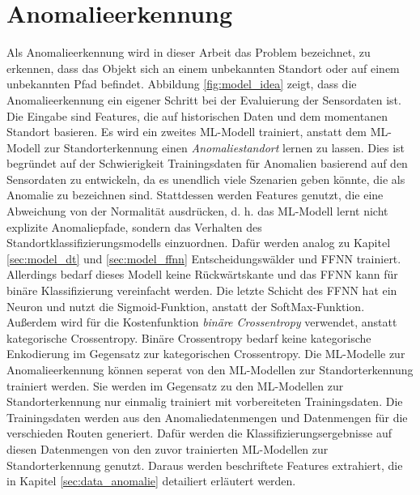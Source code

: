 \section{Anomalieerkennung}
Als Anomalieerkennung wird in dieser Arbeit das Problem bezeichnet, zu erkennen, dass das Objekt sich an einem
unbekannten Standort oder auf einem unbekannten Pfad befindet.
Abbildung \ref{fig:model_idea} zeigt, dass die Anomalieerkennung ein eigener Schritt bei der Evaluierung der Sensordaten ist.
Die Eingabe sind Features, die auf historischen Daten und dem momentanen Standort basieren.
\newline
\newline
Es wird ein zweites ML-Modell trainiert, anstatt dem ML-Modell zur Standorterkennung einen \textit{Anomaliestandort} lernen zu lassen.
Dies ist begründet auf der Schwierigkeit Trainingsdaten für Anomalien basierend auf den Sensordaten zu entwickeln,
da es unendlich viele Szenarien geben könnte, die als Anomalie zu bezeichnen sind.
Stattdessen werden Features genutzt, die eine Abweichung von der Normalität ausdrücken,
d. h. das ML-Modell lernt nicht explizite Anomaliepfade, sondern das Verhalten des Standortklassifizierungsmodells einzuordnen.
\newline
\newline
Dafür werden analog zu Kapitel \ref{sec:model_dt} und \ref{sec:model_ffnn} Entscheidungswälder und FFNN trainiert.
Allerdings bedarf dieses Modell keine Rückwärtskante und das FFNN kann für binäre Klassifizierung vereinfacht werden.
Die letzte Schicht des FFNN hat ein Neuron und nutzt die Sigmoid-Funktion, anstatt der SoftMax-Funktion.
Außerdem wird für die Kostenfunktion \textit{binäre Crossentropy} verwendet, anstatt kategorische Crossentropy.
Binäre Crossentropy bedarf keine kategorische Enkodierung im Gegensatz zur kategorischen Crossentropy.
\newline
\newline
Die ML-Modelle zur Anomalieerkennung können seperat von den ML-Modellen zur Standorterkennung trainiert werden.
Sie werden im Gegensatz zu den ML-Modellen zur Standorterkennung nur einmalig trainiert mit vorbereiteten Trainingsdaten.
Die Trainingsdaten werden aus den Anomaliedatenmengen und Datenmengen für die verschieden Routen generiert.
Dafür werden die Klassifizierungsergebnisse auf diesen Datenmengen von den zuvor trainierten ML-Modellen zur Standorterkennung genutzt.
Daraus werden beschriftete Features extrahiert, die in Kapitel \ref{sec:data_anomalie} detailiert erläutert werden.